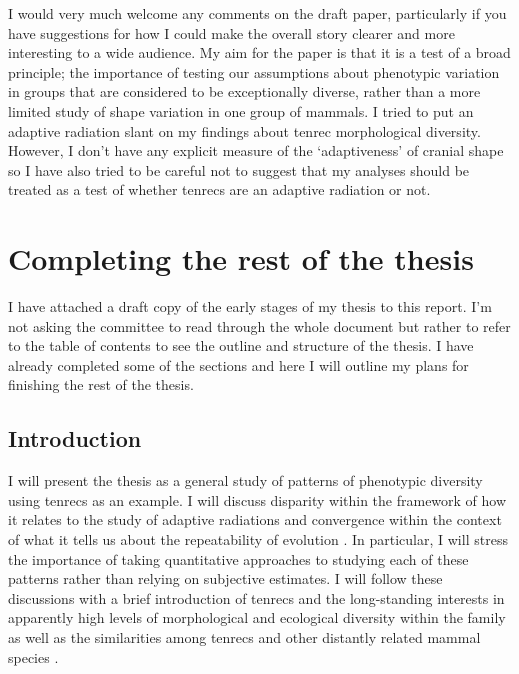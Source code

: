 \documentclass[12pt,a4paper]{article}
\begin{document}
	I would very much welcome any comments on the draft paper, particularly if you have suggestions for how I could make the overall story clearer and more interesting to a wide audience. My aim for the paper is that it is a test of a broad principle; the importance of testing our assumptions about phenotypic variation in groups that are considered to be exceptionally diverse, rather than a more limited study of shape variation in one group of mammals. I tried to put an adaptive radiation slant on my findings about tenrec morphological diversity. However, I don't have any explicit measure of the `adaptiveness' of cranial shape so I have also tried to be careful not to suggest that my analyses should be treated as a test of whether tenrecs are an adaptive radiation or not.




\section{Completing the rest of the thesis} %

	I have attached a draft copy of the early stages of my thesis to this report. I'm not asking the committee to read through the whole document but rather to refer to the table of contents to see the outline and structure of the thesis. I have already completed some of the sections and here I will outline my plans for finishing the rest of the thesis.

\subsection{Introduction}

	I will present the thesis as a general study of patterns of phenotypic diversity using tenrecs as an example.
	I will discuss disparity within the framework of how it relates to the study of adaptive radiations \citep{Losos2010a} and convergence within the context of what it tells us about the repeatability of evolution \citep[e.g][]{Blount2008}. In particular, I will stress the importance of taking quantitative approaches to studying each of these patterns rather than relying on subjective estimates. I will follow these discussions with a brief introduction of tenrecs and the long-standing interests in apparently high levels of morphological and ecological diversity within the family as well as the similarities among tenrecs and other distantly related mammal species \citep[e.g.][]{Eisenberg1969, Soarimalala2011, Olson2013}. 
\end{document}
